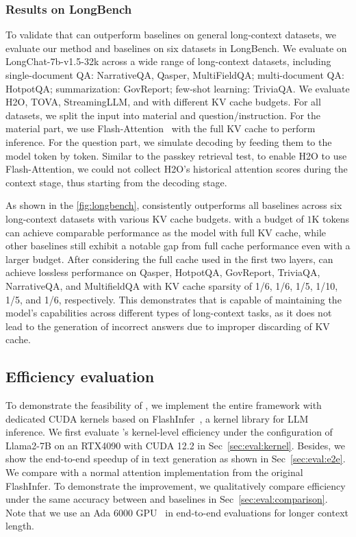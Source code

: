 \subsubsection{Results on LongBench}

To validate that \method can outperform baselines on general long-context datasets, we evaluate our method and baselines on six datasets in LongBench. We evaluate on LongChat-7b-v1.5-32k across a wide range of long-context datasets, including single-document QA: NarrativeQA, Qasper, MultiFieldQA; multi-document QA: HotpotQA; summarization: GovReport; few-shot learning: TriviaQA. We evaluate H2O, TOVA, StreamingLLM, and \method with different KV cache budgets. For all datasets, we split the input into material and question/instruction. For the material part, we use Flash-Attention~\cite{dao2022flashattention} with the full KV cache to perform inference. For the question part, we simulate decoding by feeding them to the model token by token. Similar to the passkey retrieval test, to enable H2O to use Flash-Attention, we could not collect H2O's historical attention scores during the context stage, thus starting from the decoding stage.

As shown in the \fig\ref{fig:longbench}, \method consistently outperforms all baselines across six long-context datasets with various KV cache budgets. \method with a budget of $1$K tokens can achieve comparable performance as the model with full KV cache, while other baselines still exhibit a notable gap from full cache performance even with a larger budget. After considering the full cache used in the first two layers, \method can achieve lossless performance on Qasper, HotpotQA, GovReport, TriviaQA, NarrativeQA, and MultifieldQA with KV cache sparsity of 1/6, 1/6, 1/5, 1/10, 1/5, and 1/6, respectively. This demonstrates that \method is capable of maintaining the model's capabilities across different types of long-context tasks, as it does not lead to the generation of incorrect answers due to improper discarding of KV cache.

\subsection{Efficiency evaluation}
To demonstrate the feasibility of \method{}, we implement the entire framework with dedicated CUDA kernels based on FlashInfer~\cite{flashinfer}, a kernel library for LLM inference. We first evaluate \method{}'s kernel-level efficiency under the configuration of Llama2-7B on an RTX4090 with CUDA 12.2 in Sec~\ref{sec:eval:kernel}. Besides, we show the end-to-end speedup of \method{} in text generation as shown in Sec~\ref{sec:eval:e2e}. We compare \method{} with a normal attention implementation from the original FlashInfer. To demonstrate the improvement, we qualitatively compare efficiency under the same accuracy between \method{} and baselines in Sec~\ref{sec:eval:comparison}. Note that we use an Ada 6000 GPU~\cite{ada6000} in end-to-end evaluations for longer context length.

